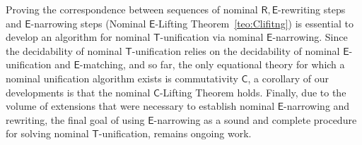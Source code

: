 \documentclass[submission,copyright,creativecommons]{eptcs}
\newcommand{\alert}[1]{\textcolor{red}{#1}}
\newcommand{\theory}[1]{\ensuremath{\mathsf{#1}}}
\theoremstyle{plain}
\theoremstyle{definition}
\theoremstyle{remark}
\begin{document}
 Proving the correspondence between sequences of nominal \theory{R,E}-rewriting steps and \theory{E}-narrowing steps (Nominal \theory{E}-Lifting Theorem~\ref{teo:Clifitng}) is essential to develop an algorithm for nominal \theory{T}-unification via nominal \theory{E}-narrowing. Since the decidability of nominal \theory{T}-unification relies on the decidability of nominal \theory{E}-unification and \theory{E}-matching, and so far, the only equational theory for which a nominal unification algorithm exists is commutativity \theory{C}, a corollary of our developments is that the nominal \theory{C}-Lifting Theorem holds. Finally, due to the volume of extensions that were necessary to establish nominal \theory{E}-narrowing and rewriting, the final goal of using \theory{E}-narrowing as a sound and complete procedure for solving nominal \theory{T}-unification, remains ongoing work. 
 
 
 
 



\end{document}

